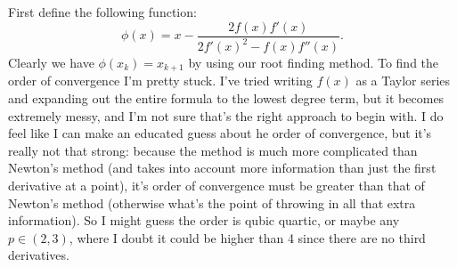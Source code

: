 \documentclass[boxes,pages]{homework}
\begin{document}
\begin{solution}
	First define the following function:
	\begin{equation*}
		\phi(x) = x - \frac{2f(x)f'(x)}{2f'(x)^2 - f(x)f''(x)}.
	\end{equation*}
	Clearly we have $\phi(x_k) = x_{k+1}$ by using our root finding method. To find the order of convergence I'm pretty stuck. I've tried writing $f(x)$ as a Taylor series and expanding out the entire formula to the lowest degree term, but it becomes extremely messy, and I'm not sure that's the right approach to begin with. I do feel like I can make an educated guess about he order of convergence, but it's really not that strong: because the method is much more complicated than Newton's method (and takes into account more information than just the first derivative at a point), it's order of convergence must be greater than that of Newton's method (otherwise what's the point of throwing in all that extra information). So I might guess the order is qubic quartic, or maybe any $p\in(2, 3)$, where I doubt it could be higher than 4 since there are no third derivatives.
\end{solution}
\end{document}
